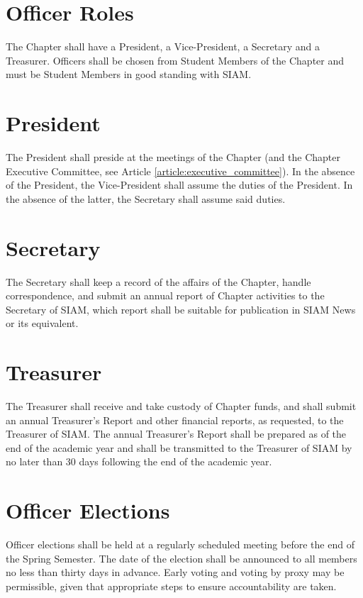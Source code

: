 \documentclass{ronr-bylaws}
\newcommand{\refarticle}[1]{Article \ref{#1}}
\begin{document}
\label{article:officers}
\section{Officer Roles}\label{section:officer_roles}
The Chapter shall have a President, a Vice-President, a Secretary and a Treasurer. Officers shall be
chosen from Student Members of the Chapter and must be Student Members in good standing with SIAM.

\section{President}\label{section:president}
The President shall preside at the meetings of the Chapter (and the Chapter Executive Committee, see
\refarticle{article:executive_committee}).  In the absence of the President, the Vice-President
shall assume the duties of the President.  In the absence of the latter, the Secretary shall assume
said duties.

\section{Secretary}\label{section:secretary}
The Secretary shall keep a record of the affairs of the Chapter, handle correspondence, and submit
an annual report of Chapter activities to the Secretary of SIAM, which report shall be suitable for
publication in SIAM News or its equivalent.

\section{Treasurer}\label{section:treasurer}
The Treasurer shall receive and take custody of Chapter funds, and shall submit an annual
Treasurer's Report and other financial reports, as requested, to the Treasurer of SIAM.  The annual
Treasurer's Report shall be prepared as of the end of the academic year and shall be transmitted to
the Treasurer of SIAM by no later than 30 days following the end of the academic year.

\section{Officer Elections}\label{section:officer_elections}
Officer elections shall be held at a regularly scheduled meeting before the end of the Spring
Semester. The date of the election shall be announced to all members no less than thirty days in
advance. Early voting and voting by proxy may be permissible, given that appropriate steps to ensure
accountability are taken.
\end{document}
